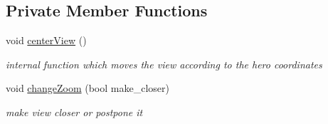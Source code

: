 \subsection*{Private Member Functions}
\begin{DoxyCompactItemize}
\item 
\mbox{\label{class_advanced_display_a7bc4ba26e6834551f95769ff6be3da84}} 
void \hyperlink{class_advanced_display_a7bc4ba26e6834551f95769ff6be3da84}{center\+View} ()
\begin{DoxyCompactList}\small\item\em internal function which moves the view according to the hero coordinates \end{DoxyCompactList}\item 
void \hyperlink{class_advanced_display_adaa4a1772d599c5224bf8f0c3476138a}{change\+Zoom} (bool make\+\_\+closer)
\begin{DoxyCompactList}\small\item\em make view closer or postpone it \end{DoxyCompactList}\end{DoxyCompactItemize}
